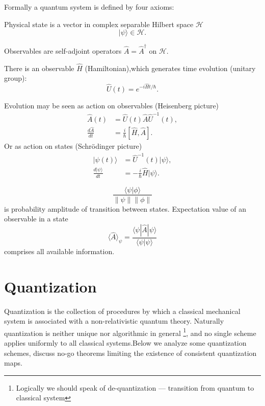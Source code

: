 Formally a quantum system is defined by four axioms:
\begin{axiom}[States]
    \label{states}
Physical state is a vector in complex separable Hilbert space $ \mathcal{H} $
\[ |\psi \rangle \in \mathcal{H} .\]
\end{axiom}
\begin{axiom}[Observables]
    \label{observs}
Observables are self-adjoint operators $ \hat A= \hat A^\dagger$ on $\mathcal H$. 
\end{axiom}
\begin{axiom}[Dynamics]
    \label{dynamics}
    There is an observable $ \hat H$ (Hamiltonian),which generates time evolution
    (unitary group):
    \begin{equation}
       \label {evol}
 \hat U(t) = e^{-i \hat Ht/\hbar}.
    \end{equation}
\end{axiom}
    Evolution may be seen as action on observables (Heisenberg picture)
\begin{align}
   \hat A(t)&= \hat U(t) \hat A \hat U^{-1}(t), \label {heis1}\\
    \frac{d \hat A}{d t} &= \frac{i}{\hbar}[\hat H,\hat A].\label{heis2}
\end{align}
    Or as action on states (Schr\"odinger picture)
\begin{align}
    |\psi(t)\rangle&= \hat U^{-1}(t) |\psi \rangle, \label{schr1} \\
    \frac{d |\psi \rangle}{d t} &=-\frac{i}{\hbar} \hat H |\psi \rangle. \label{schr2}
\end{align}
\begin{axiom}
    \label{born-rule}
    \[  \frac{\langle{\psi}|{\phi}\rangle}{\|{\psi}\| \|{\phi}\|}  \]
     is probability amplitude of transition between states.
    Expectation value of an observable in a state 
    \begin{equation}
       \label {exp1}
    \langle \hat A \rangle_\psi = \frac{\langle \psi| \hat A |\psi \rangle} {\langle \psi|\psi \rangle}
    \end{equation}
    comprises all available information.
\end{axiom}

\section{Quantization }
\label{quantization}

Quantization is the collection of procedures by which a classical mechanical 
system is associated with a non-relativistic quantum theory. 
Naturally  quantization is neither unique nor algorithmic in general 
\footnote{ Logically we should speak of de-quantization --- transition from quantum to classical system }, 
and no single scheme applies uniformly to all classical systems.Below  we analyze some quantization schemes, 
discuss no-go theorems limiting the existence of consistent quantization maps.

